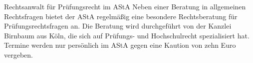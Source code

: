 \begin{artikel}{Rechtsanwalt für Prüfungsrecht im AStA}
Neben einer Beratung in allgemeinen Rechtsfragen bietet der AStA regelmäßig eine besondere Rechtsberatung für Prüfungsrechtsfragen an. Die Beratung wird durchgeführt von der Kanzlei Birnbaum aus Köln, die sich auf Prüfungs- und Hochschulrecht spezialisiert hat. Termine werden nur persönlich im AStA gegen eine Kaution von zehn Euro vergeben.
\end{artikel}
